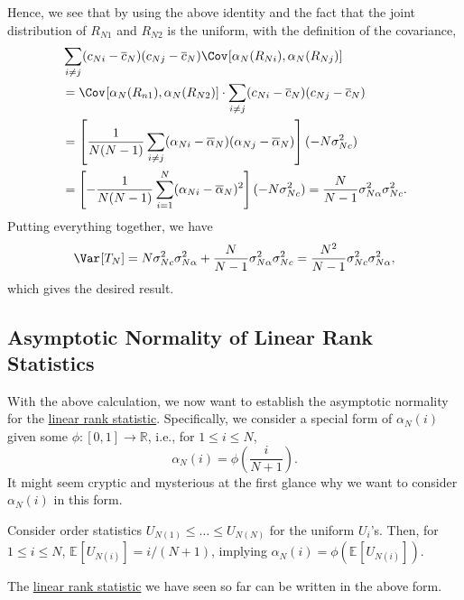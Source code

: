 \begin{explanation}
	Hence, we see that by using the above identity and the fact that the joint distribution of \(R_{N1}\) and \(R_{N2}\) is the uniform, with the definition of the covariance,
	\begin{align*}
		 & \sum_{i \neq j} (c_{Ni} - \overline{c} _N)(c_{Nj} - \overline{c} _N) \Cov_{}[\alpha _N(R_{Ni}) , \alpha _N(R_{Nj})]                                \\
		 & = \Cov_{}[\alpha _N(R_{n1}), \alpha _N(R_{N2})] \cdot \sum_{i \neq j} (c_{Ni} - \overline{c} _N)(c_{Nj} - \overline{c} _N)                         \\
		 & = \left[ \frac{1}{N(N-1)} \sum_{i \neq j} (\alpha _{Ni} - \overline{\alpha} _N) (\alpha _{Nj} - \overline{\alpha} _N) \right] (- N \sigma _{Nc}^2) \\
		 & = \left[ - \frac{1}{N(N-1)} \sum_{i=1}^{N} (\alpha _{Ni} - \overline{\alpha} _N)^2 \right] (- N \sigma _{Nc}^2)
		= \frac{N}{N-1} \sigma _{N \alpha }^2 \sigma _{Nc}^2 .
	\end{align*}
	Putting everything together, we have
	\[
		\Var_{}[T_N]
		= N \sigma _{Nc}^2 \sigma _{N \alpha }^2 + \frac{N}{N-1} \sigma _{N \alpha }^2 \sigma _{Nc}^2
		= \frac{N^2}{N-1}\sigma _{Nc}^2 \sigma _{N \alpha }^2,
	\]
	which gives the desired result.
\end{explanation}

\subsection{Asymptotic Normality of Linear Rank Statistics}
With the above calculation, we now want to establish the asymptotic normality for the \hyperref[def:linrea-rank-statistic]{linear rank statistic}. Specifically, we consider a special form of \(\alpha _N(i)\) given some \(\phi \colon [0, 1] \to \mathbb{R} \), i.e., for \(1 \leq i \leq N\),
\[
	\alpha _N(i) = \phi \left( \frac{i}{N+1} \right) .
\]
It might seem cryptic and mysterious at the first glance why we want to consider \(\alpha _N(i)\) in this form.

\begin{intuition}
	Consider order statistics \(U_{N(1)} \leq \dots \leq U_{N(N)}\) for the uniform \(U_i\)'s. Then, for \(1 \leq i \leq N\), \(\mathbb{E}_{}[U_{N(i)}] = i / (N+1)\), implying \(\alpha _N(i) = \phi (\mathbb{E}_{}[U_{N(i)}] )\).
\end{intuition}

\begin{eg}
	The \hyperref[def:linrea-rank-statistic]{linear rank statistic} we have seen so far can be written in the above form.
\end{eg}

